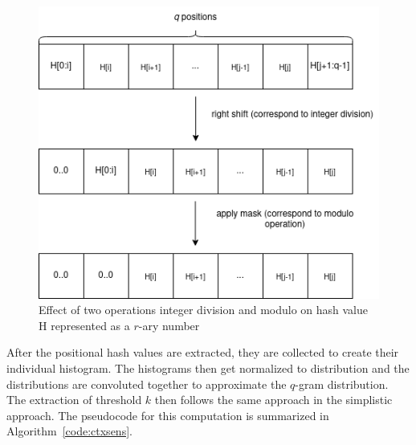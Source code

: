 \documentclass[twoside,a4paper,bsc]{master}
\newcommand{\Qgram}[1]{\(#1\)-gram}
\begin{document}
\begin{figure}[t]
\begin{center}
\includegraphics[scale=0.5]{graphics/hash_extract.png}
\end{center}
\caption{Effect of two operations integer division and modulo on hash value H 
represented as a \(r\)-ary number}
\label{fig:hash_extract}
\end{figure}

After the positional hash values are extracted, they are collected to
create
their individual histogram. The histograms then get normalized to
distribution
and the distributions are convoluted together to approximate the \Qgram{q}
distribution. The extraction of
threshold \(k\) then follows the same approach in the simplistic approach.
The
pseudocode for this computation is
summarized in Algorithm~\ref{code:ctxsens}.
\end{document}
